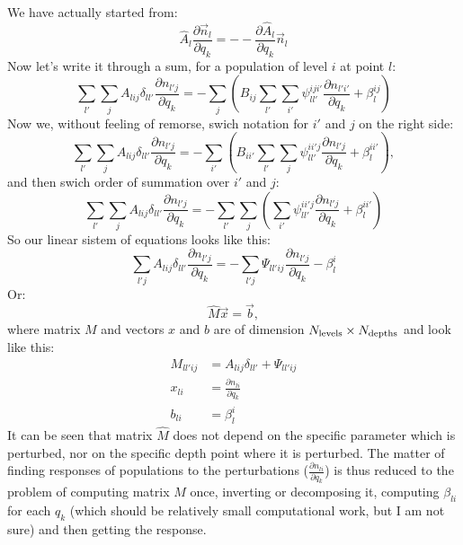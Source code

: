 \documentclass[a4paper]{article}
\begin{document}
We have actually started from:
\begin{equation}
\hat{A}_l \frac{\partial \vec{n}_l}{\partial q_k} = - -\frac{\partial \hat{A}_l}{\partial q_k} \vec{n}_l
\end{equation}
Now let's write it through a sum, for a population of level $i$ at point $l$:
\begin{equation}
\sum_{l'} \sum_j A_{lij} \delta_{ll'} \frac{\partial n_{l'j}}{\partial q_k} = - \sum_j \left ( B_{ij} \sum_{l'} \sum_{i'} \psi_{ll'}^{iji'} \frac{\partial n_{l'i'}}{\partial q_k} + \beta_l^{ij} \right )
\end{equation}
Now we, without feeling of remorse, swich notation for $i'$ and $j$ on the right side:
\begin{equation}
\sum_{l'} \sum_j A_{lij} \delta_{ll'} \frac{\partial n_{l'j}}{\partial q_k} = - \sum_{i'} \left ( B_{ii'} \sum_{l'} \sum_{j} \psi_{ll'}^{ii'j} \frac{\partial n_{l'j}}{\partial q_k} + \beta_l^{ii'} \right ),
\end{equation}
and then swich order of summation over $i'$ and $j$:
\begin{equation}
\sum_{l'} \sum_j A_{lij} \delta_{ll'} \frac{\partial n_{l'j}}{\partial q_k} = - \sum_{l'} \sum_{j} \left ( \sum_{i'} \psi_{ll'}^{ii'j} \frac{\partial n_{l'j}}{\partial q_k} + \beta_l^{ii'}  \right )
\end{equation}
So our linear sistem of equations looks like this:
\begin{equation}
\sum_{l'j} A_{lij} \delta_{ll'} \frac{\partial n_{l'j}}{\partial q_k} = - \sum_{l'j} \Psi_{ll'ij}  \frac{\partial n_{l'j}}{\partial q_k} - \beta_l^i
\end{equation}
Or:
\begin{equation}
\hat{M}\vec{x} = \vec{b},
\end{equation}
where matrix $M$ and vectors $x$ and $b$ are of dimension $N_{\rm levels} \times N_{\rm depths}$ and look like this:
\begin{eqnarray}
M_{ll'ij} & = A_{lij} \delta_{ll'} + \Psi_{ll'ij} \\
x_{li} & = \frac{\partial n_{li}}{\partial q_k} \\
b_{li} & = \beta_{l}^i
\end{eqnarray}
It can be seen that matrix $\hat{M}$ does not depend on the specific parameter which is perturbed, nor on the specific depth point where it is perturbed. The matter of finding responses of populations to the perturbations ($\frac{\partial n_{li}}{\partial q_k}$) is thus reduced to the problem of computing matrix $M$ once, inverting or decomposing it, computing $\beta_{li}$ for each $q_k$ (which should be relatively small computational work, but I am not sure) and then getting the response. 
\end{document}
